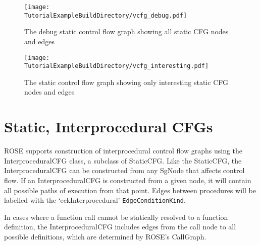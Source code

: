 \begin{figure}
\texttt{[image: \\TutorialExampleBuildDirectory/vcfg\_debug.pdf]}
\caption{The debug static control flow graph showing all static CFG nodes
and edges}
\label{tutorial:exampleOutputCodeDebugPDFForStaticCFG}
\end{figure}


\begin{figure}
\texttt{[image: \\TutorialExampleBuildDirectory/vcfg\_interesting.pdf]}
\caption{The static control flow graph showing only interesting static CFG nodes and edges}
\label{tutorial:exampleOutputCodeInterestingPDFForStaticCFG}
\end{figure}

\section{Static, Interprocedural CFGs}

ROSE supports construction of interprocedural control flow graphs using the InterproceduralCFG class, 
a subclass of StaticCFG. Like the StaticCFG, the InterproceduralCFG can be constructed 
from any SgNode that affects control flow. If an InterproceduralCFG is constructed from a given node, 
it will contain all possible paths of execution from that point. 
Edges between procedures will be labelled with the `eckInterprocedural' 
{\tt EdgeConditionKind}.

In cases where a function call cannot be statically resolved to a function definition, the 
InterproceduralCFG includes edges from the call node to all possible definitions, which are
determined by ROSE's CallGraph.  


